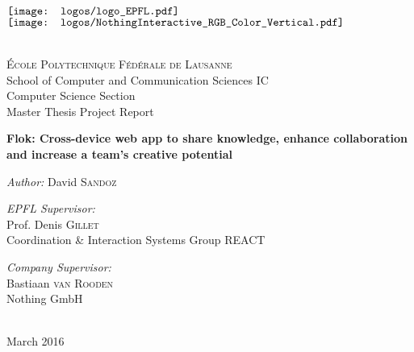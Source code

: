 
\begin{titlepage}

\begin{center}

\begin{minipage}{6in}
  \centering
  $\vcenter{\hbox{\texttt{[image: logos/logo\_EPFL.pdf]}}}$
  \hspace*{2cm}
  $\vcenter{\hbox{\texttt{[image: logos/NothingInteractive\_RGB\_Color\_Vertical.pdf]}}}$
\end{minipage}\\[2 cm]

{\Large \textsc{École Polytechnique Fédérale de Lausanne}}\\[0.5cm]
{\large School of Computer and Communication Sciences IC}\\[0.5cm]
{\large Computer Science Section}\\[0.5cm]
{\LARGE Master Thesis Project Report}\\[0.5cm]

\vspace{1cm}

{\huge \bfseries Flok: Cross-device web app to share knowledge, enhance collaboration and increase a team's creative potential}\\[0.4cm]

\vspace{1.5cm}

\large \emph{Author:} David \textsc{Sandoz}\\[1.5cm]

\begin{minipage}{0.5\textwidth}
\begin{flushleft} \large
\emph{EPFL Supervisor:}\\
Prof. Denis \textsc{Gillet}\\
Coordination \& Interaction Systems Group REACT
\end{flushleft}
\end{minipage}
\begin{minipage}{0.4\textwidth}
\begin{flushright} \large
\emph{Company Supervisor:}\\
Bastiaan \textsc{van Rooden}\\
Nothing GmbH\\
~
\end{flushright}
\end{minipage}

\vfill

{\large March 2016}

\end{center}

\end{titlepage}

\pagecolor{white}
\color{black}

